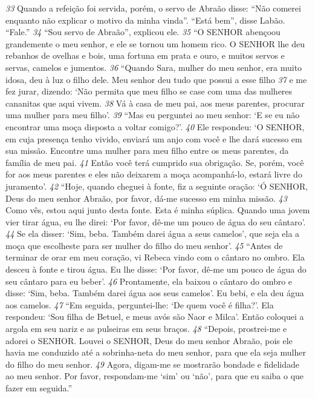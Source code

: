 \bigskip
\textit{\tiny 33}
Quando a refeição foi servida,
porém, o servo de Abraão disse: “Não comerei enquanto não explicar o motivo da
minha vinda”.
   “Está bem”, disse Labão. “Fale.”
\textit{\tiny 34}
“Sou servo de Abraão”, explicou ele. 
\textit{\tiny 35}
“O SENHOR abençoou grandemente o
meu senhor, e ele se tornou um homem rico. O SENHOR lhe deu rebanhos de
ovelhas e bois, uma fortuna em prata e ouro, e muitos servos e servas, camelos e
jumentos.
\textit{\tiny 36}
“Quando Sara, mulher do meu senhor, era muito idosa, deu à luz o filho dele.
Meu senhor deu tudo que possui a esse filho 
\textit{\tiny 37}
e me fez jurar, dizendo: ‘Não
permita que meu filho se case com uma das mulheres cananitas que aqui vivem.
\textit{\tiny 38}
Vá à casa de meu pai, aos meus parentes, procurar uma mulher para meu filho’.
\textit{\tiny 39}
“Mas eu perguntei ao meu senhor: ‘E se eu não encontrar uma moça disposta
a voltar comigo?’. 
\textit{\tiny 40}
Ele respondeu: ‘O SENHOR, em cuja presença tenho vivido,
enviará um anjo com você e lhe dará sucesso em sua missão. Encontre uma
mulher para meu filho entre os meus parentes, da família de meu pai. 
\textit{\tiny 41}
Então
você terá cumprido sua obrigação. Se, porém, você for aos meus parentes e eles
não deixarem a moça acompanhá-lo, estará livre do juramento’.
\textit{\tiny 42}
“Hoje, quando cheguei à fonte, fiz a seguinte oração: ‘Ó SENHOR, Deus do meu
senhor Abraão, por favor, dá-me sucesso em minha missão. 
\textit{\tiny 43}
Como vês, estou
aqui junto desta fonte. Esta é minha súplica. Quando uma jovem vier tirar água, eu
lhe direi: ‘Por favor, dê-me um pouco de água do seu cântaro’. 
\textit{\tiny 44}
Se ela disser:
‘Sim, beba. Também darei água a seus camelos’, que seja ela a moça que
escolheste para ser mulher do filho do meu senhor’.
\textit{\tiny 45}
“Antes de terminar de orar em meu coração, vi Rebeca vindo com o cântaro
no ombro. Ela desceu à fonte e tirou água. Eu lhe disse: ‘Por favor, dê-me um
pouco de água do seu cântaro para eu beber’. 
\textit{\tiny 46}
Prontamente, ela baixou o cântaro
do ombro e disse: ‘Sim, beba. Também darei água aos seus camelos’. Eu bebi, e ela
deu água aos camelos.
\textit{\tiny 47}
“Em seguida, perguntei-lhe: ‘De quem você é filha?’. Ela respondeu: ‘Sou filha
de Betuel, e meus avós são Naor e Milca’. Então coloquei a argola em seu nariz e as
pulseiras em seus braços.
\textit{\tiny 48}
“Depois, prostrei-me e adorei o SENHOR. Louvei o SENHOR, Deus do meu
senhor Abraão, pois ele havia me conduzido até a sobrinha-neta do meu senhor,
para que ela seja mulher do filho do meu senhor. 
\textit{\tiny 49}
Agora, digam-me se
mostrarão bondade e fidelidade ao meu senhor. Por favor, respondam-me ‘sim’
ou ‘não’, para que eu saiba o que fazer em seguida.”

